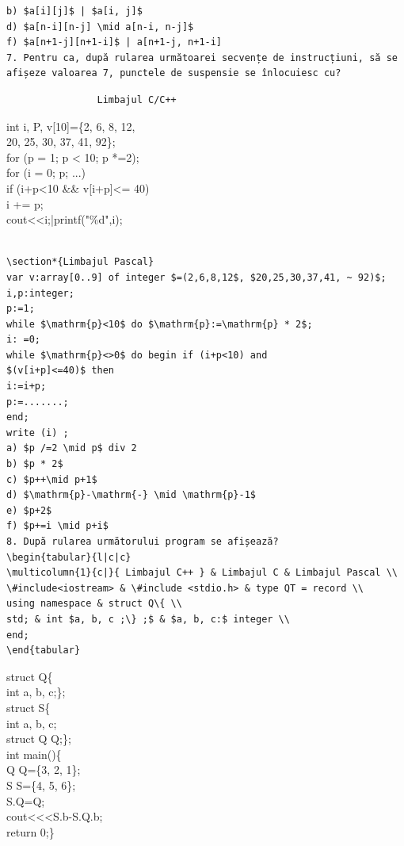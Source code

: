 \documentclass[10pt]{article}
\begin{document}
\begin{verbatim}
b) $a[i][j]$ | $a[i, j]$
d) $a[n-i][n-j] \mid a[n-i, n-j]$
f) $a[n+1-j][n+1-i]$ | a[n+1-j, n+1-i]
7. Pentru ca, după rularea următoarei secvențe de instrucțiuni, să se afișeze valoarea 7, punctele de suspensie se înlocuiesc cu?
\end{verbatim}

\begin{verbatim}
                Limbajul C/C++
\end{verbatim}

int i, P, v[10]=\{2, 6, 8, 12,\\
20, 25, 30, 37, 41, 92\};\\
for (p = 1; p < 10; p *=2);\\
for (i = 0; p; ...)\\[0pt]
if (i+p<10 \&\& v[i+p]<= 40)\\
i += p;\\
cout<<i;|printf("\%d",i);

\begin{verbatim}

\section*{Limbajul Pascal}
var v:array[0..9] of integer $=(2,6,8,12$, $20,25,30,37,41, ~ 92)$;
i,p:integer;
p:=1;
while $\mathrm{p}<10$ do $\mathrm{p}:=\mathrm{p} * 2$;
i: =0;
while $\mathrm{p}<>0$ do begin if (i+p<10) and
$(v[i+p]<=40)$ then
i:=i+p;
p:=.......;
end;
write (i) ;
a) $p /=2 \mid p$ div 2
b) $p * 2$
c) $p++\mid p+1$
d) $\mathrm{p}-\mathrm{-} \mid \mathrm{p}-1$
e) $p+2$
f) $p+=i \mid p+i$
8. După rularea următorului program se afișează?
\begin{tabular}{l|c|c}
\multicolumn{1}{c|}{ Limbajul C++ } & Limbajul C & Limbajul Pascal \\
\#include<iostream> & \#include <stdio.h> & type QT = record \\
using namespace & struct Q\{ \\
std; & int $a, b, c ;\} ;$ & $a, b, c:$ integer \\
end;
\end{tabular}
\end{verbatim}

struct Q\{\\
int a, b, c;\};\\
struct S\{\\
int a, b, c;\\
struct Q Q;\};\\
int main()\{\\
Q Q=\{3, 2, 1\};\\
S S=\{4, 5, 6\};\\
S.Q=Q;\\
cout<<<S.b-S.Q.b;\\
return 0;\}
\end{document}
